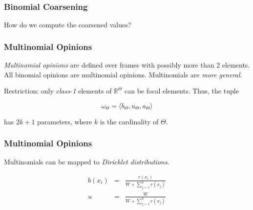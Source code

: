 \documentclass{beamer}
\begin{document}

\begin{frame}
\frametitle{Binomial Coarsening}

How do we compute the coarsened values?










\end{frame}



\begin{frame}
\frametitle{Multinomial Opinions}

\emph{Multinomial opinions} are defined over frames with possibly more than 2 elements.
All binomial opinions are multinomial opinions. Multinomials are \emph{more general}.

Restriction: only \emph{class-1} elements of $\mathbb{R}^\Theta$ can be focal elements.
Thus, the tuple

$$
\omega_\Theta = \langle b_\Theta, u_\Theta, a_\Theta \rangle
$$

has $2k + 1$ parameters, where $k$ is the cardinality of $\Theta$.

\end{frame}


\begin{frame}
\frametitle{Multinomial Opinions}

Multinomials can be mapped to \emph{Dirichlet distributions}.

\begin{eqnarray}
  b(x_i) &=& \frac{r(x_i)}{W + \sum_{j = 1}^k r(x_j)} \\
  u      &=& \frac{W}{W + \sum_{j = 1}^k r(x_j)}
\end{eqnarray}

\end{frame}

\end{document}
